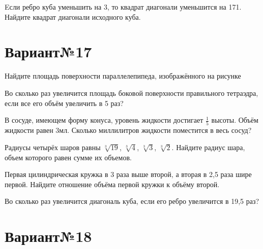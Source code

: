 \documentclass[4apaper]{article}
\begin{document}
\begin{taskBN}{6}
Eсли ребро куба уменьшить на 3, то квадрат диагонали уменьшится на 171. Найдите квадрат диагонали исходного куба.
\end{taskBN}
\newpage\section*{Вариант№17}

\begin{taskBN}{1}
Найдите площадь поверхности параллелепипеда, изображённого на рисунке
\end{taskBN}

\begin{taskBN}{2}
Во сколько раз увеличится площадь боковой поверхности правильного тетраэдра, если все его объём увеличить в 5 раз?
\end{taskBN}

\begin{taskBN}{3}
В сосуде, имеющем форму конуса, уровень жидкости достигает $\frac{1}{5}$ высоты. Объём жидкости равен 3мл. Сколько миллилитров жидкости поместится в весь сосуд?
\end{taskBN}

\begin{taskBN}{4}
Радиусы четырёх шаров равны $\sqrt[3]{19}$, $\sqrt[3]{4}$, $\sqrt[3]{3}$, $\sqrt[3]{2}$. Найдите радиус шара, объем которого равен сумме их объемов.
\end{taskBN}

\begin{taskBN}{5}
 Первая цилиндрическая кружка в 3 раза выше второй, а вторая в 2,5 раза шире первой. Найдите отношение объёма первой кружки к объёму второй.
\end{taskBN}

\begin{taskBN}{6}
Во сколько раз увеличится диагональ куба, если его ребро увеличится в 19,5 раз?
\end{taskBN}
\newpage\section*{Вариант№18}
\end{document}
